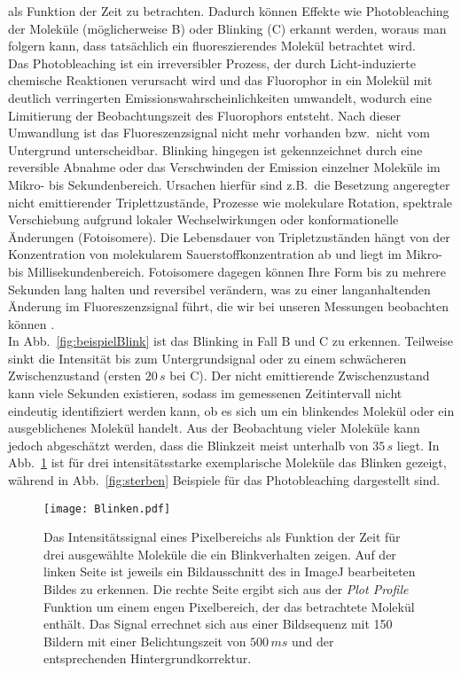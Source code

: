 als Funktion der Zeit zu betrachten. 
Dadurch können Effekte wie Photobleaching der Moleküle (möglicherweise B) 
oder Blinking (C) erkannt werden, woraus man folgern kann, 
dass tatsächlich ein fluoreszierendes Molekül betrachtet wird. \\
Das Photobleaching ist ein irreversibler Prozess, der durch Licht-induzierte 
chemische Reaktionen verursacht wird und das Fluorophor in ein Molekül mit 
deutlich verringerten Emissionswahrscheinlichkeiten umwandelt, 
wodurch eine Limitierung der Beobachtungszeit des Fluorophors entsteht.
Nach dieser Umwandlung ist das Fluoreszenzsignal nicht mehr vorhanden bzw.~nicht vom 
Untergrund unterscheidbar.
Blinking hingegen ist gekennzeichnet durch eine reversible Abnahme 
oder das Verschwinden der Emission einzelner Moleküle im Mikro- bis Sekundenbereich.
Ursachen hierfür sind z.B.~die Besetzung angeregter nicht emittierender Triplettzustände,
Prozesse wie molekulare Rotation, spektrale Verschiebung aufgrund lokaler 
Wechselwirkungen oder konformationelle Änderungen (Fotoisomere).
Die Lebensdauer von Tripletzuständen hängt von der Konzentration von 
molekularem Sauerstoffkonzentration ab und liegt im Mikro- bis Millisekundenbereich.
Fotoisomere dagegen können Ihre Form bis zu mehrere Sekunden lang halten und reversibel 
verändern, was zu einer langanhaltenden Änderung im Fluoreszenzsignal führt, 
die wir bei unseren Messungen beobachten können \cite{fluo}. \\
In Abb.~\ref{fig:beispielBlink} ist das Blinking in Fall B und C 
zu erkennen. Teilweise sinkt die Intensität bis zum Untergrundsignal 
oder zu einem schwächeren Zwischenzustand (ersten $20\,\si{s}$ bei C). 
Der nicht emittierende Zwischenzustand kann viele Sekunden existieren, 
sodass im gemessenen Zeitintervall nicht eindeutig identifiziert werden kann, 
ob es sich um ein blinkendes Molekül oder ein ausgeblichenes Molekül 
handelt. Aus der Beobachtung vieler Moleküle kann jedoch abgeschätzt werden, 
dass die Blinkzeit meist unterhalb von $35\,\si{s}$ liegt.
In Abb.~\ref{fig:blinken} ist für drei intensitätsstarke 
exemplarische Moleküle das Blinken gezeigt, während 
in Abb.~\ref{fig:sterben} Beispiele für das Photobleaching
dargestellt sind.
\begin{figure}[h!]
    \centering
    \texttt{[image: Blinken.pdf]}
    \caption{\label{fig:blinken}Das Intensitätssignal eines Pixelbereichs als Funktion
    der Zeit für drei ausgewählte Moleküle die ein Blinkverhalten zeigen. Auf der linken 
    Seite ist jeweils ein Bildausschnitt des in ImageJ bearbeiteten Bildes zu erkennen. 
    Die rechte Seite ergibt sich aus der \textit{Plot Profile} Funktion um einem engen 
    Pixelbereich, der das betrachtete Molekül enthält. Das Signal errechnet sich aus einer 
    Bildsequenz mit 150 Bildern mit einer Belichtungszeit von $500\,\si{ms}$ und der 
    entsprechenden Hintergrundkorrektur.}
\end{figure}\FloatBarrier
